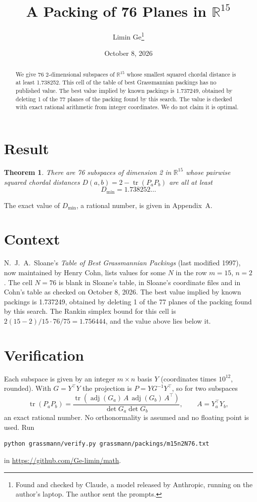 \documentclass[11pt,a4paper]{article}
\title{A Packing of 76 Planes in $\mathbb{R}^{15}$}
\author{Limin Ge\thanks{Found and checked by Claude, a model released by Anthropic, running on the author's laptop. The author sent the prompts.}}
\date{October 8, 2026}
\newtheorem*{theorem}{Theorem}
\begin{document}
\maketitle
\begin{abstract}
We give 76 2-dimensional subspaces of $\mathbb{R}^{15}$ whose smallest squared chordal distance is at least 1.738252. This cell of the table of best Grassmannian packings has no published value. The best value implied by known packings is 1.737249, obtained by deleting 1 of the 77 planes of the packing found by this search. The value is checked with exact rational arithmetic from integer coordinates. We do not claim it is optimal.
\end{abstract}

\section{Result}
\begin{theorem}
There are 76 subspaces of dimension 2 in $\mathbb{R}^{15}$ whose pairwise squared chordal distances $D(a,b) = 2 - \operatorname{tr}(P_aP_b)$ are all at least
\[ D_{\min} = 1.738252\ldots \]
\end{theorem}
The exact value of $D_{\min}$, a rational number, is given in Appendix~A.


\section{Context}
N.~J.~A.~Sloane's \emph{Table of Best Grassmannian Packings} (last modified 1997), now maintained by Henry Cohn, lists values for some $N$ in the row $m=15$, $n=2$. The cell $N=76$ is blank in Sloane's table, in Sloane's coordinate files and in Cohn's table as checked on October 8, 2026. The best value implied by known packings is 1.737249, obtained by deleting 1 of the 77 planes of the packing found by this search. The Rankin simplex bound for this cell is $2(15-2)/15\cdot 76/75 = 1.756444$, and the value above lies below it.


\section{Verification}
Each subspace is given by an integer $m\times n$ basis $Y$ (coordinates times $10^{12}$, rounded). With $G=Y^\top Y$ the projection is $P=YG^{-1}Y^\top$, so for two subspaces
\[ \operatorname{tr}(P_aP_b)=\frac{\operatorname{tr}(\operatorname{adj}(G_a)\,A\,\operatorname{adj}(G_b)\,A^\top)}{\det G_a\det G_b},\qquad A=Y_a^\top Y_b, \]
an exact rational number. No orthonormality is assumed and no floating point is used. Run
\begin{verbatim}
python grassmann/verify.py grassmann/packings/m15n2N76.txt
\end{verbatim}
in \url{https://github.com/Ge-limin/math}.
\end{document}
